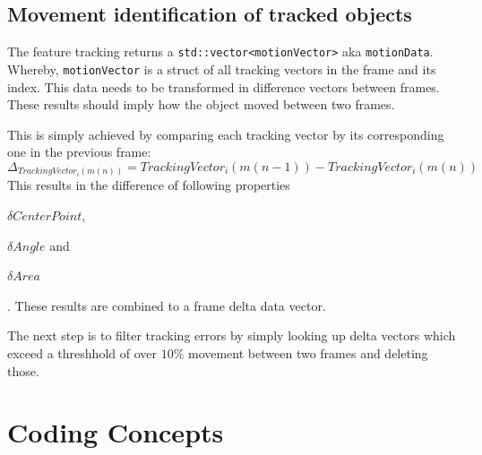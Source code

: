 \subsection{Movement identification of tracked objects}
The feature tracking returns a \texttt{std::vector<motionVector>} aka \texttt{motionData}. Whereby, \texttt{motionVector} is a struct of all tracking vectors in the frame and its index. This data needs to be transformed in difference vectors between frames. These results should imply how the object moved between two frames.

This is simply achieved by comparing each tracking vector by its corresponding one in the previous frame:
\[\Delta_{TrackingVector_i(m(n))} = TrackingVector_i(m(n-1)) - TrackingVector_i(m(n))\]
This results in the difference of following properties \begin{enumerate*}[label= (\roman*)]
    \item $\delta CenterPoint$, \item $\delta Angle$ and \item $\delta Area$
\end{enumerate*}. These results are combined to a frame delta data vector.

The next step is to filter tracking errors by simply looking up delta vectors which exceed a threshhold of over $10\%$ movement between two frames and deleting those.







%
%         
%         
\section{Coding Concepts}



\printbibliography\cleardoublepage


